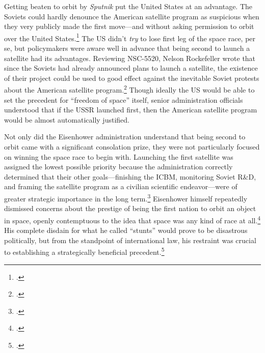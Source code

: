 \documentclass[11pt]{memoir}
\begin{document}
Getting beaten to orbit by \emph{Sputnik} put the United States at an advantage. The Soviets could hardly denounce the American satellite program as suspicious when they very publicly made the first move---and without asking permission to orbit over the United States.\footcite[p.~40]{peebles_corona_1997} The US didn't \emph{try} to lose first leg of the space race, per se, but policymakers were aware well in advance that being second to launch a satellite had its advantages. Reviewing NSC-5520, Nelson Rockefeller wrote that since the Soviets had already announced plans to launch a satellite, the existence of their project could be used to good effect against the inevitable Soviet protests about the American satellite program.\footcite[p.~120]{mcdougall_heavens_1985} Though ideally the US would be able to set the precedent for ``freedom of space'' itself, senior administration officials understood that if the USSR launched first, then the American satellite program would be almost automatically justified.

Not only did the Eisenhower administration understand that being second to orbit came with a significant consolation prize, they were not particularly focused on winning the space race to begin with. Launching the first satellite was assigned the lowest possible priority because the administration correctly determined that their other goals---finishing the ICBM, monitoring Soviet R\&D, and framing the satellite program as a civilian scientific endeavor---were of greater strategic importance in the long term.\footcite[p.~123-124]{mcdougall_heavens_1985} Eisenhower himself repeatedly dismissed concerns about the prestige of being the first nation to orbit an object in space, openly contemptuous to the idea that space was any kind of race at all.\footcite[p.~100]{lindgren_trust_2000} His complete disdain for what he called ``stunts'' would prove to be disastrous politically, but from the standpoint of international law, his restraint was crucial to establishing a strategically beneficial precedent.\footcite[p.~134]{day_eye_2015}
\end{document}
